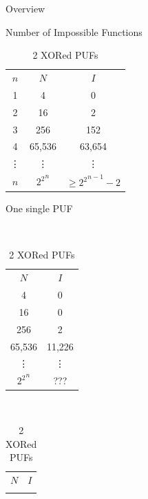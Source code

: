 \documentclass[10pt, compress]{beamer}
\begin{document}
\begin{frame}{Overview}
    \begin{table}[H]
    \caption{Number of Impossible Functions}
    \label{function_overview}    
    \def\arraystretch{1.45}
        \begin{subtable}{0.40\textwidth}
            \centering
            \begin{tabular}{|c|c|c|}
            \hline
            $n$     & $N$       & $I$                       \\ \Xhline{5\arrayrulewidth}
            1       & 4         & 0                         \\ \hline
            2       & 16        & 2                         \\ \hline
            3       & 256       & 152                       \\ \hline
            4       & 65,536    & 63,654                    \\ \hline
            \vdots  & \vdots    & \vdots                    \\ \hline
            $n$     & ${2^2}^n$ & $\geq	{2^2}^{n-1} - 2$    \\ \hline
            \end{tabular}
        \caption{One single PUF}
        \end{subtable}
        ~ 
        \begin{subtable}{0.28\textwidth}
            \centering
            \begin{tabular}{|c|c|}
            \hline
            $N$       & $I$       \\ \Xhline{5\arrayrulewidth}
            4         & 0         \\ \hline
            16        & 0         \\ \hline
            256       & 2         \\ \hline
            65,536    & 11,226    \\ \hline
            \vdots    & \vdots    \\ \hline
            ${2^2}^n$ & ???       \\ \hline
            \end{tabular}
        \caption{2 XORed PUFs}
        \end{subtable}
        ~
        \begin{subtable}{0.23\textwidth}
            \centering
            \begin{tabular}{|c|c|}
            \hline
            $N$       & $I$       \\ \Xhline{5\arrayrulewidth}

\end{tabular}
\end{subtable}
\end{table}
\end{frame}
\end{document}
